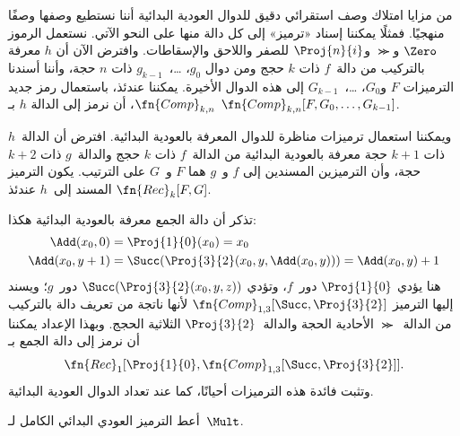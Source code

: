 \documentclass[../../../include/open-logic-section]{subfiles}
\begin{document}

من مزايا امتلاك وصف استقرائي دقيق للدوال العودية البدائية أننا نستطيع
وصفها وصفًا منهجيًا. فمثلًا يمكننا إسناد «ترميز» إلى كل دالة منها على
النحو الآتي. نستعمل الرموز $\Zero$ و$\Succ$ و$\Proj{n}{i}$ للصفر
واللاحق والإسقاطات. وافترض الآن أن $h$ معرفة بالتركيب من دالة~$f$ ذات
$k$ حجج ومن دوال $g_0$، …،~$g_{k-1}$ ذات $n$ حجة، وأننا أسندنا
الترميزات $F$ و$G_0$، …،~$G_{k-1}$ إلى هذه الدوال الأخيرة. يمكننا
عندئذ، باستعمال رمز جديد $\fn{Comp}_{k,n}$، أن نرمز إلى الدالة $h$ بـ
$\fn{Comp}_{k,n}[F,G_0,\dots,G_{k-1}]$.

ويمكننا استعمال ترميزات مناظرة للدوال المعرفة بالعودية البدائية. افترض
أن الدالة~$h$ ذات $k+1$ حجة معرفة بالعودية البدائية من الدالة~$f$ ذات
$k$ حجج والدالة~$g$ ذات $k+2$ حجة، وأن الترميزين المسندين إلى $f$
و~$g$ هما $F$ و~$G$ على الترتيب. يكون الترميز المسند إلى~$h$ عندئذ
$\fn{Rec}_k[F,G]$.

تذكر أن دالة الجمع معرفة بالعودية البدائية هكذا:
\begin{align*}
  \Add(x_0, 0) & = \Proj{1}{0}(x_0) = x_0\\
  \Add(x_0, y+1) & = \Succ(\Proj{3}{2}(x_0, y, \Add(x_0, y))) = \Add(x_0, y) +1
\end{align*}
هنا يؤدي $\Proj{1}{0}$ دور~$f$، وتؤدي
$\Succ(\Proj{3}{2}(x_0,y,z))$ دور~$g$؛ ويسند إليها الترميز
$\fn{Comp}_{1,3}[\Succ,\Proj{3}{2}]$ لأنها ناتجة من تعريف دالة
بالتركيب من الدالة~$\Succ$ الأحادية الحجة والدالة~$\Proj{3}{2}$
الثلاثية الحجج. وبهذا الإعداد يمكننا أن نرمز إلى دالة الجمع بـ
\[
\fn{Rec}_1[\Proj{1}{0},\fn{Comp}_{1,3}[\Succ,\Proj{3}{2}]].
\]
وتثبت فائدة هذه الترميزات أحيانًا، كما عند تعداد الدوال العودية البدائية.

\begin{prob}
  أعط الترميز العودي البدائي الكامل لـ~$\Mult$.
\end{prob}
\end{document}
